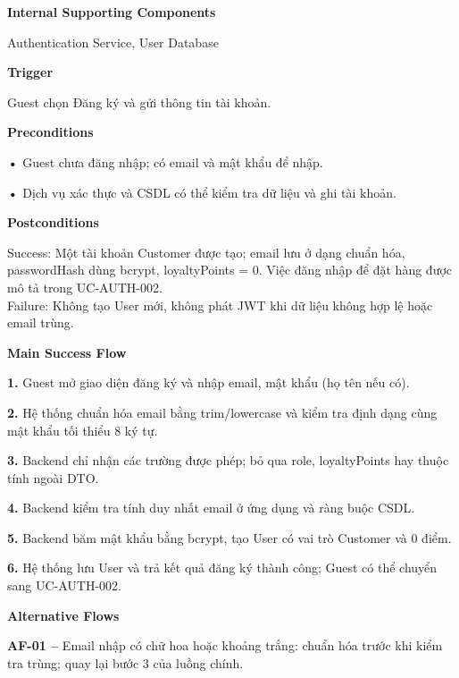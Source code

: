 \documentclass[11pt,a4paper,oneside]{report}
\begin{document}
\par\smallskip\noindent\textcolor{sgublue}{\textbf{Internal Supporting Components}}\par\nobreak
Authentication Service, User Database
\par

\par\smallskip\noindent\textcolor{sgublue}{\textbf{Trigger}}\par\nobreak
Guest chọn Đăng ký và gửi thông tin tài khoản.
\par

\par\smallskip\noindent\textcolor{sgublue}{\textbf{Preconditions}}\par\nobreak
\textbf{•} Guest chưa đăng nhập; có email và mật khẩu để nhập.

\textbf{•} Dịch vụ xác thực và CSDL có thể kiểm tra dữ liệu và ghi tài khoản.
\par

\par\smallskip\noindent\textcolor{sgublue}{\textbf{Postconditions}}\par\nobreak
Success: Một tài khoản Customer được tạo; email lưu ở dạng chuẩn hóa, passwordHash dùng bcrypt, loyaltyPoints = 0. Việc đăng nhập để đặt hàng được mô tả trong UC-AUTH-002.\\
Failure: Không tạo User mới, không phát JWT khi dữ liệu không hợp lệ hoặc email trùng.\strut
\par

\par\smallskip\noindent\textcolor{sgublue}{\textbf{Main Success Flow}}\par\nobreak
\textbf{1.} Guest mở giao diện đăng ký và nhập email, mật khẩu (họ tên nếu có).

\textbf{2.} Hệ thống chuẩn hóa email bằng trim/lowercase và kiểm tra định dạng cùng mật khẩu tối thiểu 8 ký tự.

\textbf{3.} Backend chỉ nhận các trường được phép; bỏ qua role, loyaltyPoints hay thuộc tính ngoài DTO.

\textbf{4.} Backend kiểm tra tính duy nhất email ở ứng dụng và ràng buộc CSDL.

\textbf{5.} Backend băm mật khẩu bằng bcrypt, tạo User có vai trò Customer và 0 điểm.

\textbf{6.} Hệ thống lưu User và trả kết quả đăng ký thành công; Guest có thể chuyển sang UC-AUTH-002.
\par

\par\smallskip\noindent\textcolor{sgublue}{\textbf{Alternative Flows}}\par\nobreak
\textbf{AF-01 --} Email nhập có chữ hoa hoặc khoảng trắng: chuẩn hóa trước khi kiểm tra trùng; quay lại bước 3 của luồng chính.
\end{document}
